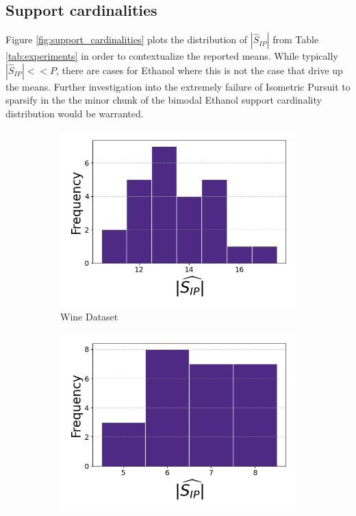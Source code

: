\newpage

\subsection{Support cardinalities}
\label{sec:support_cardinalities}

Figure \ref{fig:support_cardinalities} plots the distribution of $|\widehat{S}_{IP}|$ from Table \ref{tab:experiments} in order to contextualize the reported means.
While typically $|\widehat{S}_{IP}| << P$, there are cases for Ethanol where this is not the case that drive up the means.
Further investigation into the extremely failure of Isometric Pursuit to sparsify in the the minor chunk of the bimodal Ethanol support cardinality distribution would be warranted.

\begin{figure}[t]
    \centering
    \begin{subfigure}[b]{0.45\textwidth}
        \centering
        \includegraphics[width=\textwidth]{../figures/wine_cardinalities}
        \caption{Wine Dataset}
        \label{fig:wine_cardinalities}
    \end{subfigure}
    \hfill
    \begin{subfigure}[b]{0.45\textwidth}
        \centering
        \includegraphics[width=\textwidth]{../figures/iris_cardinalities}

\end{subfigure}
\end{figure}
